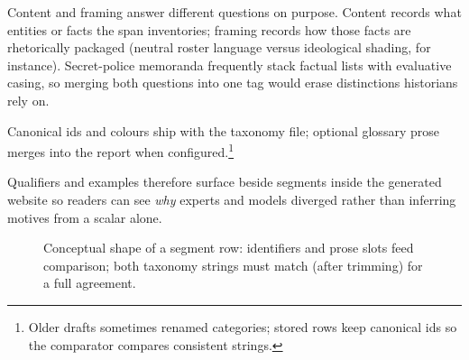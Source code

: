 \documentclass[11pt,a4paper]{article}
\theoremstyle{remark}
\begin{document}
Content and framing answer different questions on purpose. Content records what entities or facts the span inventories; framing records how those facts are rhetorically packaged (neutral roster language versus ideological shading, for instance). Secret-police memoranda frequently stack factual lists with evaluative casing, so merging both questions into one tag would erase distinctions historians rely on.

Canonical ids and colours ship with the taxonomy file; optional glossary prose merges into the report when configured.\footnote{Older drafts sometimes renamed categories; stored rows keep canonical ids so the comparator compares consistent strings.}

Qualifiers and examples therefore surface beside segments inside the generated website so readers can see \emph{why} experts and models diverged rather than inferring motives from a scalar alone.

\begin{figure}[htbp]
\centering
{}
\caption{Conceptual shape of a segment row: identifiers and prose slots feed comparison; both taxonomy strings must match (after trimming) for a full agreement.}
\label{fig:segment_row}
\end{figure}
\end{document}
